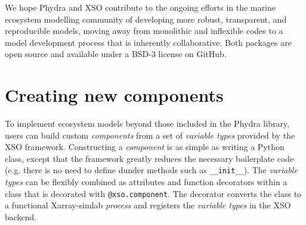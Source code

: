 \documentclass[journal abbreviation, manuscript]{copernicus}
\begin{document}
We hope Phydra and XSO contribute to the ongoing efforts in the marine ecosystem modelling community of developing more robust, transparent, and reproducible models, moving away from monolithic and inflexible codes to a model development process that is inherently collaborative. Both packages are open source and available under a BSD-3 license on GitHub.





















\appendix


\section{Creating new components}  \label{Appendix:CreatingXSOComponent}

To implement ecosystem models beyond those included in the Phydra library, users can build custom \textit{components} from a set of \textit{variable types} provided by the XSO framework. Constructing a \textit{component} is as simple as writing a Python class, except that the framework greatly reduces the necessary boilerplate code (e.g. there is no need to define dunder methods such as \texttt{\_\_init\_\_}). The \textit{variable types} can be flexibly combined as attributes and function decorators within a class that is decorated with \texttt{@xso.component}. The decorator converts the class to a functional Xarray-simlab \textit{process} and registers the \textit{variable types} in the XSO backend.
\end{document}
